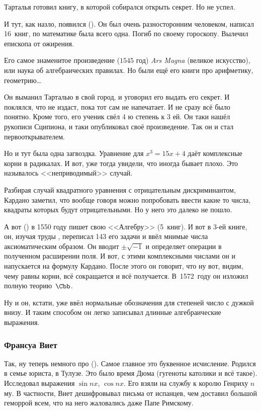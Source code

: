 \documentclass[a4paper,oneside,fleqn,10pt]{article}
\begin{document}
Тарталья готовил книгу, в которой собирался открыть секрет. Но не
успел.

И тут, как назло, появился  (). Он был очень разносторонним человеком,
написал 16~книг, по математике была всего одна. Погиб по своему
гороскопу.  Вылечил епископа от ожирения.

Его самое знаменитое произведение ($1545$ год) \emph{Ars Magna}
(великое искусство), или наука об алгебраических правилах. Но были ещё
его книги про арифметику, геометрию\ldots

Он выманил Тарталью в свой город, и уговорил его выдать его секрет. И
поклялся, что не издаст, пока тот сам не напечатает. И не сразу всё
было понятно.  Кроме того, его ученик  свёл 4 ю степень к 3 ей. Он таки нашёл
рукописи Сципиона, и таки опубликовал своё произведение. Так он и стал
первооткрывателем.

Но и тут была одна загвоздка. Уравнение для $x^3 = 15x + 4$ даёт
комплексные корни в радикалах.  И вот, уже тогда увидели, что иногда
бывает плохо. Это называлось <<неприводимый>> случай.

Разбирая случай квадратного уравнения с отрицательным дискриминантом,
Кардано заметил, что вообще говоря можно попробовать ввести какие то
числа, квадраты которых будут отрицательными.  Но у него это далеко не
пошло.

А вот  () в 1550 году
пишет свою <<Алгебру>> (5~книг).  И вот в 3-ей книге, он, изучая труды
, переписал 143 его задачи и ввёл мнимые
числа аксиоматическим образом. Он вводит $\pm\sqrt{-1}$ и определяет
операции в полученном расширении поля. И вот, с этими комплексными
числами он и напускается на формулу Кардано. После этого он говорит,
что ну вот, видим, чему равны корни, всё сокращается и всё
получается. В~1572~году он изложил полную теорию~$\Cbb$.

Ну и он, кстати, уже ввёл нормальные обозначения для степеней число с
дужкой внизу.  И таким способом он легко записывал длинные
алгебраические выражения.

\subsubsection{Франсуа Виет}

Так, ну теперь немного про 
(). Самое главное это буквенное исчисление.  Родился в
семье юриста, в Тулузе. Это было время Дюма (гугеноты католики и всё
такое).  Исследовал выражения $\sin nx$, $\cos nx$. Его взяли на
службу к королю Генриху $n$ му.  В частности, Виет дешифровывал письма
от испанцев, чем доставил большой геморрой всем, что на него
жаловались даже Папе Римскому.
\end{document}
